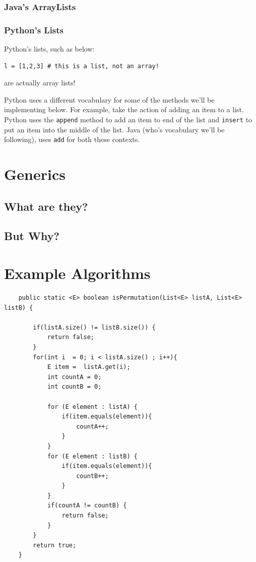 \documentclass[10pt,a4paper]{book}
\begin{document}
\subsubsection{Java's ArrayLists}
\subsubsection{Python's Lists}
Python's lists, such as below:
\begin{verbatim}
l = [1,2,3] # this is a list, not an array!	
\end{verbatim}
are actually array lists! %

Python uses a different vocabulary for some of the methods we'll be implementing below.  
For example, take the action of adding an item to a list.
Python uses the \texttt{append} method to add an item to end of the list and \texttt{insert} to put an item into the middle of the list.
Java (who's vocabulary we'll be following), uses \texttt{add} for both these contexts. 





\section{Generics}


\subsection{What are they?}

\subsection{But Why?}




\section{Example Algorithms}


\begin{verbatim}
	public static <E> boolean isPermutation(List<E> listA, List<E> listB) {
		
		if(listA.size() != listB.size()) {
			return false;
		}
		for(int i  = 0; i < listA.size() ; i++){
			E item =  listA.get(i);
			int countA = 0;
			int countB = 0;
			
			for (E element : listA) {
				if(item.equals(element)){
					countA++;
				}
			}
			for (E element : listB) {
				if(item.equals(element)){
					countB++;
				}
			}
			if(countA != countB) {
				return false;
			}
		}
		return true;
	}
\end{verbatim}
\end{document}
